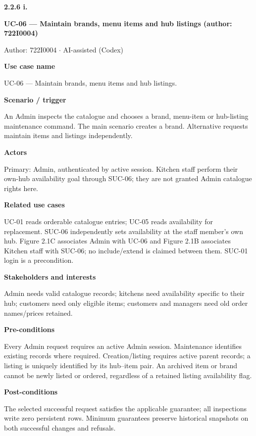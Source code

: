 \textbf{2.2.6 i.}\par
\textbf{UC-06 --- Maintain brands, menu items and hub listings (author: 722I0004)}

Author: 722I0004 \ensuremath{\cdot} AI-assisted (Codex)

\textbf{Use case name}

UC-06 --- Maintain brands, menu items and hub listings.

\textbf{Scenario / trigger}

An Admin inspects the catalogue and chooses a brand, menu-item or hub-listing maintenance command. The main scenario creates a brand. Alternative requests maintain items and listings independently.

\textbf{Actors}

Primary: Admin, authenticated by active session. Kitchen staff perform their own-hub availability goal through SUC-06; they are not granted Admin catalogue rights here.

\textbf{Related use cases}

UC-01 reads orderable catalogue entries; UC-05 reads availability for replacement. SUC-06 independently sets availability at the staff member's own hub. Figure 2.1C associates Admin with UC-06 and Figure 2.1B associates Kitchen staff with SUC-06; no include/extend is claimed between them. SUC-01 login is a precondition.

\textbf{Stakeholders and interests}

Admin needs valid catalogue records; kitchens need availability specific to their hub; customers need only eligible items; customers and managers need old order names/prices retained.

\textbf{Pre-conditions}

Every Admin request requires an active Admin session. Maintenance identifies existing records where required. Creation/listing requires active parent records; a listing is uniquely identified by its hub--item pair. An archived item or brand cannot be newly listed or ordered, regardless of a retained listing availability flag.

\textbf{Post-conditions}

The selected successful request satisfies the applicable guarantee; all inspections write zero persistent rows. Minimum guarantees preserve historical snapshots on both successful changes and refusals.

